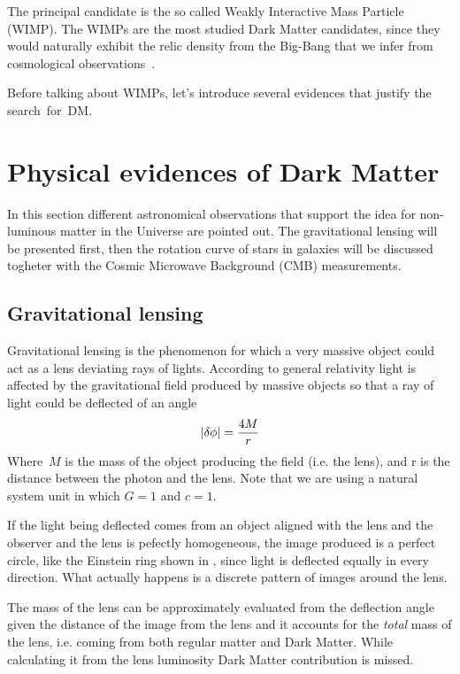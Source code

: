 The principal candidate is the so called Weakly Interactive Mass Particle (WIMP). The WIMPs are the most studied Dark Matter candidates, since they would naturally exhibit the relic density from the Big-Bang that we infer from cosmological observations~\cite{feng:DM}.

Before talking about WIMPs, let's introduce several evidences that justify the \mbox{search for DM}.

\section{Physical evidences of Dark Matter}
In this section different astronomical observations that support the idea for non-luminous matter in the Universe are pointed out. The gravitational lensing will be presented first, then the rotation curve of stars in galaxies will be discussed togheter with the Cosmic Microwave Background (CMB) measurements.

\subsection{Gravitational lensing}
Gravitational lensing is the phenomenon for which a very massive object could act as a lens deviating rays of lights. According to general relativity light is affected by the gravitational field produced by massive objects so that a ray of light could be deflected of an angle 
\begin{equation}
\lvert\delta\phi\rvert=\frac{4M}{r}
\end{equation}
Where $\,M$ is the mass of the object producing the field (i.e. the lens), and r is the distance between the photon and the lens. Note that we are using a natural system unit in which $G=1$ and $c=1$.

If the light being deflected comes from an object aligned with the lens and the observer and the lens is pefectly homogeneous, the image produced is a perfect circle, like the Einstein ring shown in \Fig{\ref{fig:einsteinring}}, since light is deflected equally in every direction. What actually happens is a discrete pattern of images around the lens.

The mass of the lens can be approximately evaluated from the deflection angle given the distance of the image from the lens and it accounts for the \emph{total} mass of the lens, i.e. coming from both regular matter and Dark Matter. While calculating it from the lens luminosity Dark Matter contribution is missed.

